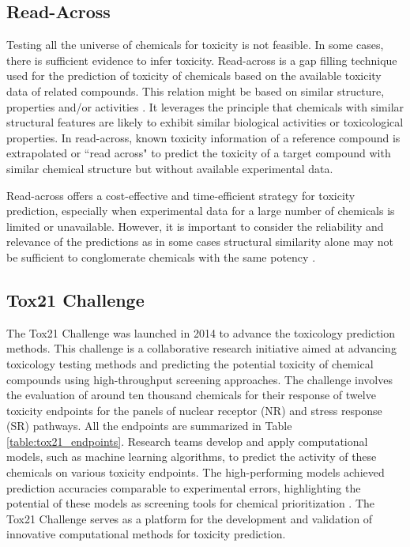 \subsection*{Read-Across}

Testing all the universe of chemicals for toxicity is not feasible. In some cases, there is sufficient evidence to infer toxicity. Read-across is a gap filling technique used for the prediction of toxicity of chemicals based on the available toxicity data of related compounds. This relation might be based on similar structure, properties and/or activities \cite{OECD_read_across}. It leverages the principle that chemicals with similar structural features are likely to exhibit similar biological activities or toxicological properties. In read-across, known toxicity information of a reference compound is extrapolated or ``read across" to predict the toxicity of a target compound with similar chemical structure but without available experimental data. 

Read-across offers a cost-effective and time-efficient strategy for toxicity prediction, especially when experimental data for a large number of chemicals is limited or unavailable. However, it is important to consider the reliability and relevance of the predictions as in some cases structural similarity alone may not be sufficient to conglomerate chemicals with the same potency \cite{Luechtefeld2015}.

\subsection*{Tox21 Challenge}

The Tox21 Challenge was launched in 2014 to advance the toxicology prediction methods. This challenge is a collaborative research initiative aimed at advancing toxicology testing methods and predicting the potential toxicity of chemical compounds using high-throughput screening approaches. The challenge involves the evaluation of around ten thousand chemicals for their response of twelve toxicity endpoints for the panels of nuclear receptor (NR) and stress response (SR) pathways. All the endpoints are summarized in Table \ref{table:tox21_endpoints}. Research teams develop and apply computational models, such as machine learning algorithms, to predict the activity of these chemicals on various toxicity endpoints. The high-performing models achieved prediction accuracies comparable to experimental errors, highlighting the potential of these models as screening tools for chemical prioritization \cite{Huang2017}. The Tox21 Challenge serves as a platform for the development and validation of innovative computational methods for toxicity prediction.

